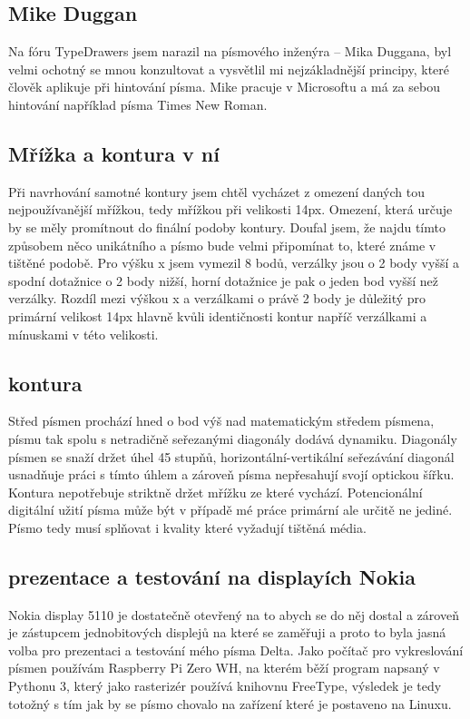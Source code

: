 \documentclass[a4paper]{article}
\begin{document}
\subsection{Mike Duggan}
Na fóru TypeDrawers jsem narazil na písmového inženýra – Mika Duggana, byl velmi ochotný se mnou konzultovat a vysvětlil mi nejzákladnější principy, které člověk aplikuje při hintování písma. Mike pracuje v Microsoftu a má za sebou hintování například písma Times New Roman.
\subsection{Mřížka a kontura v ní}
Při navrhování samotné kontury jsem chtěl vycházet z omezení daných tou nejpoužívanější mřížkou, tedy mřížkou při velikosti 14px. Omezení, která určuje by se měly promítnout do finální podoby kontury. Doufal jsem, že najdu tímto způsobem něco unikátního a písmo bude velmi připomínat to, které známe v tištěné podobě. Pro výšku x jsem vymezil 8 bodů, verzálky jsou o 2 body vyšší a spodní dotažnice o 2 body nižší, horní dotažnice je pak o jeden bod vyšší než verzálky. Rozdíl mezi výškou x a verzálkami o právě 2 body je důležitý pro primární velikost 14px hlavně kvůli identičnosti kontur napříč verzálkami a mínuskami v této velikosti.
\subsection{kontura}
Střed písmen prochází hned o bod výš nad matematickým středem písmena, písmu tak spolu s netradičně seřezanými diagonály dodává dynamiku. Diagonály písmen se snaží držet úhel 45 stupňů, horizontální-vertikální seřezávání diagonál usnadňuje práci s tímto úhlem a zároveň písma nepřesahují svojí optickou šířku. Kontura nepotřebuje striktně držet mřížku ze které vychází. Potencionální digitální užití písma může být v případě mé práce primární ale určitě ne jediné. Písmo tedy musí splňovat i kvality které vyžadují tištěná média.
\subsection{prezentace a testování na displayích Nokia}
Nokia display 5110 je dostatečně otevřený na to abych se do něj dostal a zároveň je zástupcem jednobitových displejů na které se zaměřuji a proto to byla jasná volba pro prezentaci a testování mého písma Delta. Jako počítač pro vykreslování písmen používám Raspberry Pi Zero WH, na kterém běží program napsaný v Pythonu 3, který jako rasterizér používá knihovnu FreeType, výsledek je tedy totožný s tím jak by se písmo chovalo na zařízení které je postaveno na Linuxu. 
\end{document}
